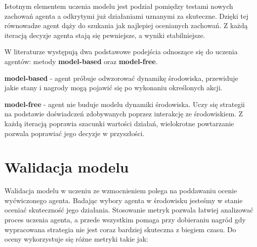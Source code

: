 \documentclass{iiuwb}
\begin{document}
Istotnym elementem uczenia modelu jest podział pomiędzy testami nowych zachowań agenta a odkrytymi już działaniami uznanymi za skuteczne. 
Dzięki tej równowadze agent dąży do szukania jak najlepiej ocenianych zachowań. Z każdą iteracją decyzje agenta stają się pewniejsze, a wyniki stabilniejsze.

W literaturze występują dwa podstawowe podejścia odnoszące się do uczenia agentów: metody \textbf{model-based} oraz \textbf{model-free}.

\textbf{model-based} - agent próbuje odwzorować dynamikę środowiska, przewiduje jakie stany i nagrody mogą pojawić się po wykonaniu określonych akcji. 

\textbf{model-free} - agent nie buduje modelu dynamiki środowiska. Uczy się strategii na podstawie doświadczeń zdobywanych poprzez interakcję ze środowiskiem. Z każdą iteracją poprawia szacunki wartości działań, wielokrotne powtarzanie pozwala poprawiać jego decyzje w przyszłości. 




\clearpage
\section{Walidacja modelu}
Walidacja modelu w uczeniu ze wzmocnieniem polega na poddawaniu ocenie wyćwiczonego agenta. Badając wybory agenta w środowisku jesteśmy w stanie oceniać skuteczność jego działania. Stosowanie metryk pozwala łatwiej analizować proces uczenia agenta, a przede wszystkim pomaga przy dobieraniu nagród gdy wypracowana strategia nie jest coraz bardziej skuteczna z biegiem czasu.
Do oceny wykorzystuje się różne metryki takie jak:
\end{document}
